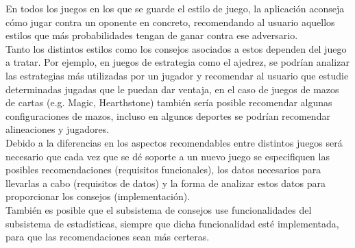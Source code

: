 En todos los juegos en los que se guarde el estilo de juego, la aplicación
aconseja cómo jugar contra un oponente en concreto, recomendando al usuario aquellos
estilos que más probabilidades tengan de ganar contra ese adversario.\\

Tanto los distintos estilos como los consejos asociados a estos dependen
del juego a tratar. Por ejemplo, en juegos de estrategia como el ajedrez, se podrían
analizar las estrategias más utilizadas por un jugador y recomendar al usuario
que estudie determinadas jugadas que le puedan dar ventaja, en el caso de juegos
de mazos de cartas (e.g. Magic, Hearthstone) también sería posible recomendar algunas
configuraciones de mazos, incluso en algunos deportes se podrían recomendar
alineaciones y jugadores.\\

Debido a la diferencias en los aspectos recomendables entre distintos juegos será
necesario que cada vez que se dé soporte a un nuevo juego se especifiquen 
las posibles recomendaciones (requisitos funcionales), los datos necesarios
para llevarlas a cabo (requisitos de datos) y la forma de analizar estos datos
para proporcionar los consejos (implementación).\\

También es posible que el subsistema de consejos use funcionalidades del subsistema
de estadísticas, siempre que dicha funcionalidad esté implementada, para que las
recomendaciones sean más certeras.\\

